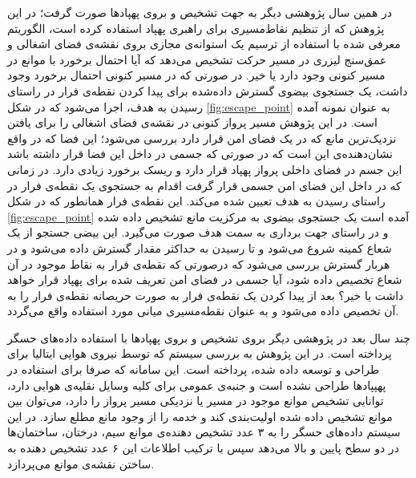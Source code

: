 
در همین سال پژوهشی دیگر به جهت تشخیص و  بروی پهپادها صورت گرفت؛ در این پژوهش که از تنظیم نقاط‌مسیری برای راهبری پهپاد استفاده کرده است، الگوریتم معرفی شده با استفاده از ترسیم یک استوانه‌ی مجازی بروی نقشه‌ی فضای اشغالی و عمق‌سنج لیزری در مسیر حرکت تشخیص می‌دهد که آیا احتمال برخورد با موانع در مسیر کنونی وجود دارد یا خیر. در صورتی که در مسیر کنونی احتمال برخورد وجود داشت، یک جستجوی بیضوی گسترش داده‌شده برای پیدا کردن نقطه‌ی فرار در راستای رسیدن به هدف، اجرا می‌شود که در شکل \ref{fig:escape_point} به عنوان نمونه آمده است. در این پژوهش مسیر پرواز کنونی در نقشه‌ی فضای اشغالی را برای یافتن نزدیک‌ترین مانع که در یک فضای امن قرار دارد بررسی می‌شود؛ این فضا که در واقع نشان‌دهنده‌ی این است که در صورتی که جسمی در داخل این فضا قرار داشته باشد این جسم در فضای داخلی پرواز پهپاد قرار دارد و ریسک برخورد زیادی دارد. در زمانی که در داخل این فضای امن جسمی قرار گرفت اقدام به جستجوی یک نقطه‌ی فرار در راستای رسیدن به هدف تعیین شده می‌کند. این نقطه‌ی فرار همانطور که در شکل \ref{fig:escape_point} آمده است یک جستجوی بیضوی به مرکزیت مانع تشخیص داده شده و در راستای جهت برداری به سمت هدف صورت می‌گیرد. این بیضی جستجو از یک شعاع کمینه شروع می‌شود و تا رسیدن به حداکثر مقدار گسترش داده می‌شود و در هربار گسترش بررسی می‌شود که درصورتی که نقطه‌ی فرار به نقاط موجود در آن شعاع تخصیص داده شود، آیا جسمی در فضای امن تعریف شده برای پهپاد قرار خواهد داشت یا خیر؟ بعد از پیدا کردن یک نقطه‌ی فرار به صورت حریصانه نقطه‌ی فرار را به آن تخصیص داده می‌شود و به عنوان نقطه‌‌مسیری میانی مورد استفاده واقع می‌گردد.


چند سال بعد در  پژوهشی دیگر بروی تشخیص و  بروی پهپادها با استفاده داده‌های حسگر  پرداخته است. در این پژوهش به بررسی سیستم  که توسط نیروی هوایی ایتالیا برای  طراحی و توسعه داده شده، پرداخته است. این سامانه که صرفا برای استفاده در پهپپادها طراحی نشده است و جنبه‌ی عمومی برای کلیه وسایل نقلیه‌ی هوایی دارد، توانایی تشخیص موانع موجود در مسیر یا نزدیکی مسیر پرواز را دارد، می‌توان بین موانع تشخیص داده شده اولیت‌بندی کند و خدمه را از وجود مانع مطلع سازد. در این سیستم داده‌های حسگر را به ۳ عدد تشخیص دهنده‌ی موانع  سیم، درختان، ساختمان‌ها در دو سطح پایین و بالا می‌دهد سپس با ترکیب اطلاعات این ۶ عدد تشخیص دهنده به ساختن نقشه‌ی موانع می‌پردازد.

